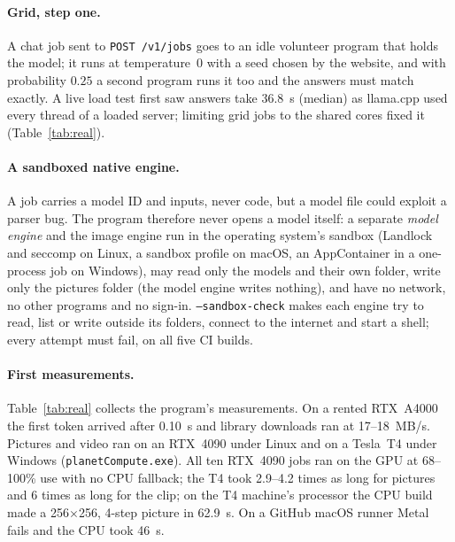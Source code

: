\documentclass[11pt,a4paper]{article}
\theoremstyle{definition}
\theoremstyle{plain}
\begin{document}
\paragraph{Grid, step one.} A chat job sent to \texttt{POST /v1/jobs} goes to an idle volunteer program that holds
the model; it runs at temperature~0 with a seed chosen by the website, and with probability $0.25$ a second
program runs it too and the answers must match exactly. A live load test first saw answers take 36.8~s (median) as llama.cpp used every thread of a loaded server;
limiting grid jobs to the shared cores fixed it (Table~\ref{tab:real}).

\paragraph{A sandboxed native engine.} A job carries a model ID and inputs, never code, but a model file could exploit a parser bug. The program therefore never opens a model itself: a separate \emph{model
engine} and the image engine run in the operating system's sandbox (Landlock and seccomp on Linux, a sandbox
profile on macOS, an AppContainer in a one-process job on Windows), may read only the models and their own folder,
write only the pictures folder (the model engine writes nothing), and have no network, no other programs and no
sign-in. \texttt{--sandbox-check} makes each engine try to read, list or write outside its folders, connect to the
internet and start a shell; every attempt must fail, on all five CI builds.

\paragraph{First measurements.} Table~\ref{tab:real} collects the program's measurements. On a rented RTX~A4000
the first token arrived after 0.10~s and library downloads ran at 17--18~MB/s. Pictures and video ran on an RTX~4090 under Linux and on a
Tesla~T4 under Windows (\texttt{planetCompute.exe}). All ten RTX~4090 jobs ran on the GPU
at 68--100\% use with no CPU fallback; the T4 took 2.9--4.2 times as long for pictures and 6 times as long for the
clip; on the T4 machine's processor the CPU build made a 256$\times$256, 4-step picture in 62.9~s. On a GitHub macOS runner Metal fails and the CPU took 46~s.
\end{document}
